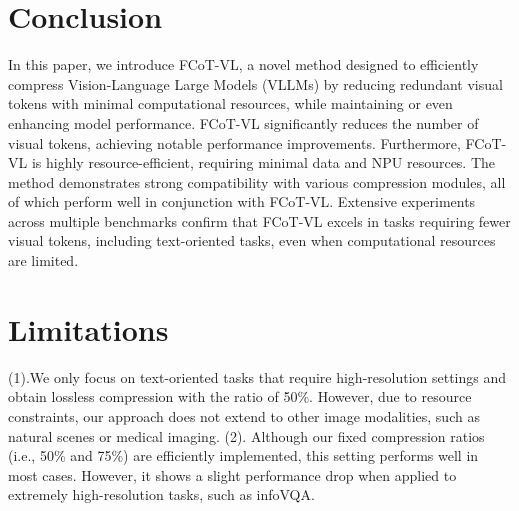 \section{Conclusion}
In this paper, we introduce FCoT-VL, a novel method designed to efficiently compress Vision-Language Large Models (VLLMs) by reducing redundant visual tokens with minimal computational resources, while maintaining or even enhancing model performance. FCoT-VL significantly reduces the number of visual tokens, achieving notable performance improvements. Furthermore, FCoT-VL is highly resource-efficient, requiring minimal data and NPU resources. The method demonstrates strong compatibility with various compression modules, all of which perform well in conjunction with FCoT-VL. Extensive experiments across multiple benchmarks confirm that FCoT-VL excels in tasks requiring fewer visual tokens, including text-oriented tasks, even when computational resources are limited.

\section{Limitations}
(1).We only focus on text-oriented tasks that require high-resolution settings and obtain lossless compression with the ratio of 50\%. However, due to resource constraints, our approach does not extend to other image modalities, such as natural scenes or medical imaging. (2). Although our fixed compression ratios (i.e., 50\% and 75\%) are efficiently implemented, this setting performs well in most cases. However, it shows a slight performance drop when applied to extremely high-resolution tasks, such as infoVQA. 
